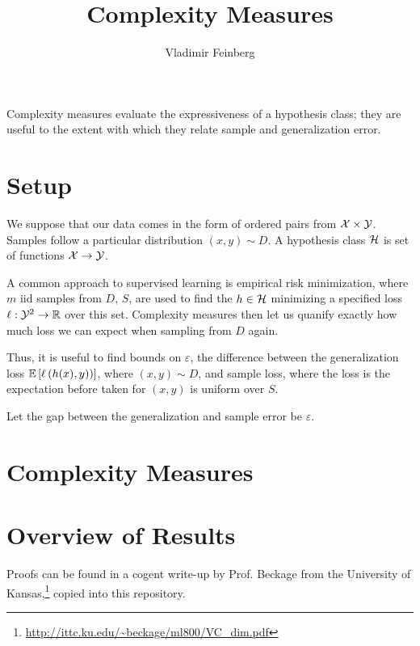 \documentclass{article}
\title{Complexity Measures}
\author{Vladimir Feinberg}
\begin{document}
\maketitle

Complexity measures evaluate the expressiveness of a hypothesis class; they are useful to the extent with which they relate sample and generalization error.

\section{Setup}

We suppose that our data comes in the form of ordered pairs from $\mathcal{X}\times \mathcal{Y}$. Samples follow a particular distribution $(x, y)\sim D$. A hypothesis class ${\mathcal{H}}$ is set of functions $\mathcal{X}\rightarrow\mathcal{Y}$.

A common approach to supervised learning is empirical risk minimization, where $m$ iid samples from $D$, $S$, are used to find the $h\in{\mathcal{H}}$ minimizing a specified loss $\ell:\mathcal{Y}^2\rightarrow\mathbb{R}$ over this set. Complexity measures then let us quanify exactly how much loss we can expect when sampling from $D$ again.

Thus, it is useful to find bounds on $\varepsilon$, the difference between the generalization loss $\operatorname{\mathbb{E}}\left[\ell\left({h(x), y)}\right)\right]$, where $(x,y)\sim D$, and sample loss, where the loss is the expectation before taken for $(x,y)$ is uniform over $S$.

Let the gap between the generalization and sample error be $\varepsilon$.

\section{Complexity Measures}

\section{Overview of Results}

Proofs can be found in a cogent write-up by Prof. Beckage from the University of Kansas,\footnote{\url{http://ittc.ku.edu/~beckage/ml800/VC_dim.pdf}} copied into this repository.
\end{document}
